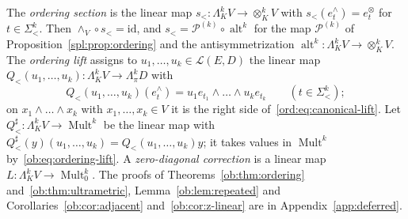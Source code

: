 \documentclass[11pt]{amsart}
\theoremstyle{definition}
\theoremstyle{remark}
\numberwithin{equation}{section}
\newcommand{\cL}{\mathcal L}
\newcommand{\Mult}{\operatorname{Mult}}
\newcommand{\id}{\mathrm{id}}
\theoremstyle{plain}
\theoremstyle{definition}
\theoremstyle{plain}
\newcommand{\alt}{\operatorname{alt}}
\newcommand{\cP}{\mathcal P}
\begin{document}
The \emph{ordering section} is the linear map $s_<\colon\Lambda^k_KV\to\otimes^k_KV$ with $s_<(e^\wedge_t)=e^\otimes_t$ for
$t\in\Sigma^k_<$. Then $\wedge_V\circ s_<=\id$, and $s_<=\cP^{(k)}\circ\alt^k$ for the map $\cP^{(k)}$ of
Proposition~\ref{spl:prop:ordering} and the antisymmetrization $\alt^k\colon\Lambda^k_KV\to\otimes^k_KV$. The
\emph{ordering lift} assigns to $u_1,\dots,u_k\in\cL(E,D)$ the linear map
$Q_<(u_1,\dots,u_k)\colon\Lambda^k_KV\to\Lambda^k_\pi D$ with
\begin{equation}\label{ob:eq:ordering-lift}
 Q_<(u_1,\dots,u_k)(e^\wedge_t)=u_1e_{t_1}\wedge\dots\wedge u_ke_{t_k}\qquad(t\in\Sigma^k_<);
\end{equation}
on $x_1\wedge\dots\wedge x_k$ with $x_1,\dots,x_k\in V$ it is the right side of~\eqref{ord:eq:canonical-lift}. Let
$Q^\sharp_<\colon\Lambda^k_KV\to\Mult^k$ be the linear map with $Q^\sharp_<(y)(u_1,\dots,u_k)=Q_<(u_1,\dots,u_k)y$; it takes
values in $\Mult^k$ by~\eqref{ob:eq:ordering-lift}. A \emph{zero-diagonal correction} is a linear map
$L\colon\Lambda^k_KV\to\Mult^k_0$. The proofs of Theorems~\ref{ob:thm:ordering} and~\ref{ob:thm:ultrametric},
Lemma~\ref{ob:lem:repeated} and Corollaries~\ref{ob:cor:adjacent} and~\ref{ob:cor:z-linear} are in
Appendix~\ref{app:deferred}.
\end{document}

